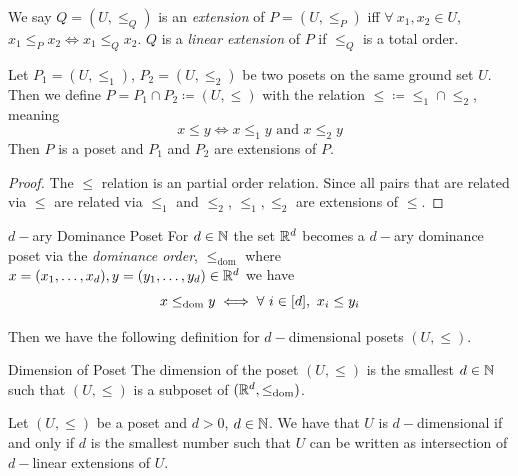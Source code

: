 We say $Q=(U,\leq_Q)$ is an \textit{extension} of $P=(U,\leq_P)$ iff $\forall\ x_1,x_2\in U$, $x_1\leq_Px_2\iff x_1\leq_Qx_2$. $Q$ is a \textit{linear extension} of $P$ if $\leq_Q$ is a total order. 
\begin{lemma}{}{}
	Let $P_1=(U,\leq _1)$, $P_2=(U,\leq_2)$ be two posets on the same ground set $U$. Then we define $P=P_1\cap P_2\coloneqq (U,\leq)$ with the relation $\leq \coloneqq \leq_1\cap \leq_2$, meaning $$x\leq y\iff x\leq_1y\text{ and }x\leq_2y$$Then $P$ is a poset and $P_1$ and $P_2$ are extensions of $P$.
\end{lemma}
\begin{proof}
	The $\leq $ relation is an partial order relation. Since all pairs that are related via $\leq $ are related via $\leq_1$ and $\leq _2$, $\leq_1,\leq_2$ are extensions of $\leq$.
\end{proof}
\begin{Definition}{$d-$ary Dominance Poset}{}
 For $d\in \mathbb{N}$ the set $\mathbb{R}^d$ becomes a $d-$ary dominance poset via the \textit{dominance order}, $\leq_{\text{dom}}$ where $x=(x_1,\dots, x_d), y=(y_1,\dots, y_d)\in \mathbb{R}^d$ we have $$x\leq_{\text{dom}} y\iff \forall\ i\in[d],\ x_i\leq y_i$$
\end{Definition}
Then we have the following definition for $d-$dimensional posets $(U,\leq)$.
\begin{Definition}{Dimension of Poset}{}
	The dimension of the poset $(U,\leq)$ is the smallest $d\in \mathbb{N}$ such that $(U,\leq)$ is a subposet of  $(\mathbb{R}^d,\leq_{\text{dom}})$.
\end{Definition}
\begin{Theorem}{}{}
	Let $(U,\leq)$  be a poset and $d>0$, $d\in\mathbb{N}$. We have that $U$ is $d-$dimensional if and only if $d$ is the smallest number such that $U$ can be written as intersection of $d-$linear extensions of $U$. 
\end{Theorem}
